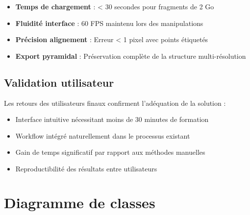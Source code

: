 \documentclass[11pt,a4paper]{report}
\begin{document}
\begin{itemize}
\item \textbf{Temps de chargement} : < 30 secondes pour fragments de 2 Go
\item \textbf{Fluidité interface} : 60 FPS maintenu lors des manipulations
\item \textbf{Précision alignement} : Erreur < 1 pixel avec points étiquetés
\item \textbf{Export pyramidal} : Préservation complète de la structure multi-résolution
\end{itemize}

\subsection{Validation utilisateur}

Les retours des utilisateurs finaux confirment l'adéquation de la solution :

\begin{itemize}
\item Interface intuitive nécessitant moins de 30 minutes de formation
\item Workflow intégré naturellement dans le processus existant
\item Gain de temps significatif par rapport aux méthodes manuelles
\item Reproductibilité des résultats entre utilisateurs
\end{itemize}

\section{Diagramme de classes}
\end{document}
